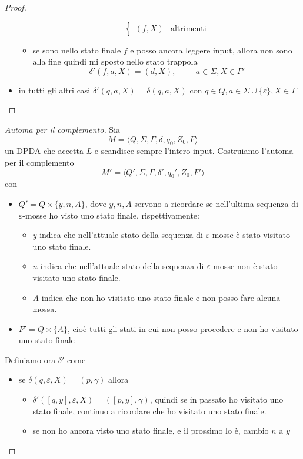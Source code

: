 \documentclass[12pt]{report}
\theoremstyle{definition}
\theoremstyle{regard}
\begin{document}
\begin{proof}
\begin{itemize}
\begin{itemize}
$$\begin{cases}
						(f, X) & \text{altrimenti}
					\end{cases}
					$$
				\item se sono nello stato finale $f$ e posso ancora leggere input, allora non sono alla fine quindi mi sposto nello stato trappola
					$$\delta'(f, a, X) = (d, X), \hspace{1cm}a \in \Sigma, X \in \Gamma'$$
			\end{itemize}
		\item in tutti gli altri casi $\delta'(q, a, X) = \delta(q, a, X)$ con $q \in Q, a \in \Sigma \cup \{\varepsilon\}, X \in \Gamma$
	\end{itemize}
\end{proof}

\begin{proof}[Automa per il complemento]
Sia 
$$ M = \langle Q, \Sigma, \Gamma, \delta, q_0, Z_0, F \rangle $$
un DPDA che accetta $L$ e scandisce sempre l'intero input.
Costruiamo l'automa per il complemento
$$ M' = \langle Q', \Sigma, \Gamma, \delta', q_0', Z_0, F' \rangle $$
con 
\begin{itemize}
	\item $Q' = Q \times \{y, n, A \}$, dove $y, n, A$ servono a ricordare se nell'ultima sequenza di $\varepsilon$-mosse ho visto uno stato finale, rispettivamente:
		\begin{itemize}
			\item $y$ indica che nell'attuale stato della sequenza di $\varepsilon$-mosse è stato visitato uno stato finale.
			\item $n$ indica che nell'attuale stato della sequenza di $\varepsilon$-mosse non è stato visitato uno stato finale.
			\item $A$ indica che non ho visitato uno stato finale e non posso fare alcuna mossa.
		\end{itemize}
	\item $F' = Q \times \{ A \}$, cioè tutti gli stati in cui non posso procedere e non ho visitato uno stato finale
\end{itemize}
Definiamo ora $\delta'$ come
\begin{itemize}
	\item se $\delta(q, \varepsilon, X) = (p, \gamma)$ allora 
		\begin{itemize}
			\item $\delta'([q, y], \varepsilon, X) = ([p, y], \gamma)$, quindi se in passato ho visitato uno stato finale, continuo a ricordare che ho visitato uno stato finale.
			\item se non ho ancora visto uno stato finale, e il prossimo lo è, cambio $n$ a $y$ 

\end{itemize}
\end{itemize}
\end{proof}
\end{document}
